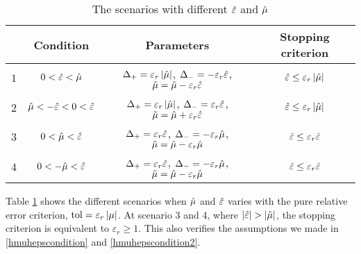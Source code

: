 \documentclass{iitthesis}
\theoremstyle{definition}
\begin{document}
\begin{table}[ht]
\caption{The scenarios with different $\hat{\varepsilon}$ and $\hat{\mu}$ \label{scenariosprop} }
\begin{tabular}{c|c|c|c}
      \hline
      \hline
       & Condition & Parameters & Stopping criterion\\
      \hline 
     $1$ & $0< \hat{\varepsilon} < \hat{\mu}  $&$\Delta_+ = \varepsilon_r\left \lvert \hat{\mu} \right \rvert$, $\Delta_- = -\varepsilon_r\hat{\varepsilon}$, 
     $\tilde{\mu} = \hat{\mu}-\varepsilon_r\hat{\varepsilon}$ & $ \hat{\varepsilon} \leq \varepsilon_r\left \lvert \hat{\mu} \right \rvert$\\
         $2$ &  $\hat{\mu} <-\hat{\varepsilon}<0<\hat{\varepsilon}$ &  $\Delta_+ = \varepsilon_r \left \lvert \hat{\mu} \right \rvert$, $\Delta_- = \varepsilon_r\hat{\varepsilon}$, 
     $\tilde{\mu} = \hat{\mu}+\varepsilon_r\hat{\varepsilon}$ & $ \hat{\varepsilon} \leq \varepsilon_r\left \lvert \hat{\mu} \right \rvert$\\
         $3$ & $ 0<\hat{\mu} <\hat{\varepsilon}$ &  $\Delta_+ = \varepsilon_r\hat{\varepsilon}$, $\Delta_- = -\varepsilon_r\hat{\mu}$, 
     $\tilde{\mu} = \hat{\mu}-\varepsilon_r\hat{\mu}$ & $ \hat{\varepsilon} \leq \varepsilon_r\hat{\varepsilon}$\\
          $4$  & $0<-\hat{\mu}<\hat{\varepsilon}$ &  $\Delta_+ = \varepsilon_r\hat{\varepsilon}$, $\Delta_- = -\varepsilon_r\hat{\mu}$, 
     $\tilde{\mu} = \hat{\mu}-\varepsilon_r\hat{\mu}$ & $ \hat{\varepsilon} \leq \varepsilon_r\hat{\varepsilon} $\\
      \hline
    \end{tabular}
\end{table}


Table \ref{scenariosprop} shows the different scenarios when $\hat{\mu}$ and $\hat{\varepsilon}$ varies with the pure relative error criterion, $\operatorname{tol} = \varepsilon_r\left \lvert \mu \right \rvert$. At scenario 3 and 4, where $\left \lvert \hat{\varepsilon} \right \rvert> \left \lvert \hat{\mu} \right \rvert$, the stopping criterion is equivalent to $\varepsilon_r \geq 1$. This also verifies the assumptions we made in \eqref{hmuhepscondition} and \eqref{hmuhepscondition2}.
\end{document}
